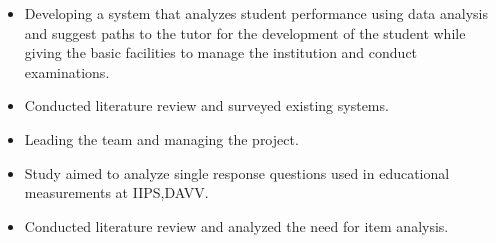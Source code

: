 \documentclass[10pt,a4paper]{altacv}
\begin{document}









\begin{itemize}
\item Developing a system that analyzes student performance using data analysis and suggest paths to the tutor for the development of the student while giving the basic facilities to manage the institution and conduct examinations.
\item Conducted literature review and surveyed existing systems.
\item Leading the team and managing the project.
\end{itemize}

\begin{itemize}
\item Study aimed to analyze single response questions used in educational measurements at IIPS,DAVV.
\item Conducted literature review and analyzed the need for item analysis.
\end{itemize}
\end{document}
